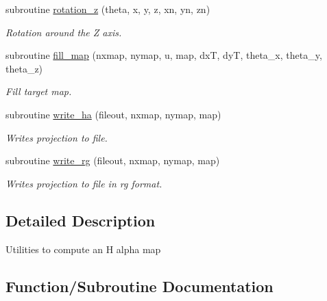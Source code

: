 \begin{DoxyCompactItemize}
subroutine \hyperlink{namespaceh__alpha__utilities_acaf25f2c0ad80c5d7e2f451f58522a49}{rotation\+\_\+z} (theta, x, y, z, xn, yn, zn)
\begin{DoxyCompactList}\small\item\em Rotation around the Z axis. \end{DoxyCompactList}\item 
subroutine \hyperlink{namespaceh__alpha__utilities_aafc5cae88b562d0bd2d039cae21ed35a}{fill\+\_\+map} (nxmap, nymap, u, map, dx\+T, dy\+T, theta\+\_\+x, theta\+\_\+y, theta\+\_\+z)
\begin{DoxyCompactList}\small\item\em Fill target map. \end{DoxyCompactList}\item 
subroutine \hyperlink{namespaceh__alpha__utilities_aa2b2b3783ef4b30d178412ea44671047}{write\+\_\+ha} (fileout, nxmap, nymap, map)
\begin{DoxyCompactList}\small\item\em Writes projection to file. \end{DoxyCompactList}\item 
subroutine \hyperlink{namespaceh__alpha__utilities_a1cf6b2b4be1a68c792b3cb07b5629af6}{write\+\_\+rg} (fileout, nxmap, nymap, map)
\begin{DoxyCompactList}\small\item\em Writes projection to file in rg format. \end{DoxyCompactList}\end{DoxyCompactItemize}


\subsection{Detailed Description}
Utilities to compute an H alpha map 

\subsection{Function/\+Subroutine Documentation}
\hypertarget{namespaceh__alpha__utilities_aafc5cae88b562d0bd2d039cae21ed35a}{}
